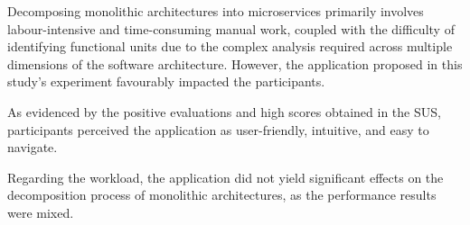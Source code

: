 Decomposing monolithic architectures into microservices primarily involves
labour-intensive and time-consuming manual work, coupled with the difficulty of
identifying functional units due to the complex analysis required across
multiple dimensions of the software architecture. However, the application
proposed in this study's experiment favourably impacted the participants.

As evidenced by the positive evaluations and high scores obtained in the SUS,
participants perceived the application as user-friendly, intuitive, and easy to
navigate.

Regarding the workload, the application did not yield significant effects on
the decomposition process of monolithic architectures, as the performance
results were mixed.
